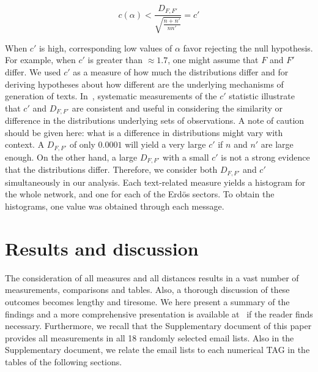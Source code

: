 \documentclass[review]{elsarticle}
\begin{document}
\begin{equation}\label{eq:ks2}
c(\alpha) < \frac{D_{F,F'}}{\sqrt{\frac{n+n'}{nn'}}} = c'
\end{equation}

When $c'$ is high, corresponding low values of $\alpha$ favor rejecting the null hypothesis.
For example, when $c'$ is greater than $\approx 1.7$, one might assume that $F$ and $F'$ differ.
We used $c'$ as a measure of how much
the distributions differ
and for deriving hypotheses
about how different are the underlying mechanisms of generation of texts.
In~\cite{kolm},
systematic measurements of the $c'$ statistic
illustrate that $c'$ and $D_{F,F'}$ are consistent and useful in considering the
similarity or difference in the distributions underlying sets of observations.
A note of caution should be given here: what is a difference in distributions
might vary with context.
A $D_{F,F'}$ of only $0.0001$ will yield a very large $c'$ if $n$ and $n'$ are large enough.
On the other hand, a large $D_{F,F'}$ with a small $c'$ is not a strong evidence that
the distributions differ.
Therefore, we consider both $D_{F,F'}$ and $c'$ simultaneously in our analysis.
Each text-related measure yields a histogram for the whole network, and one for each
of the Erdös sectors.
To obtain the histograms, one value was obtained through each message.

\section{Results and discussion}\label{sres}\label{sec:tresults}
The consideration of all measures and all distances results in a vast number of measurements, comparisons and tables.
Also, a thorough discussion of these outcomes becomes lengthy and tiresome.
We here present a summary of the findings and
a more comprehensive presentation is available at~\cite{thesis} if
the reader finds necessary.
Furthermore, we recall that the Supplementary document of this paper provides all measurements in all 18 randomly selected email lists.
Also in the Supplementary document, we relate the email lists to each numerical
TAG in the tables of the following sections.
\end{document}
